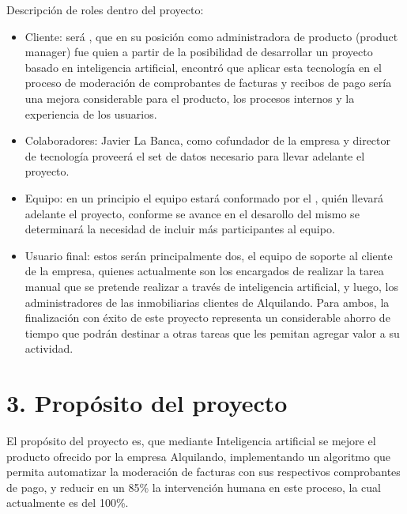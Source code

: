 \documentclass[
11pt, %
]{charter}
\begin{document}
\begin{•}
Descripción de roles dentro del proyecto:

\begin{itemize}

\item Cliente: será \clientename, que en su posición como administradora de producto (product manager) fue quien a partir de la posibilidad de desarrollar un proyecto basado en inteligencia artificial, encontró que aplicar esta tecnología en el proceso de moderación de comprobantes de facturas y recibos de pago sería una mejora considerable para el producto, los procesos internos y la experiencia de los usuarios.
\item Colaboradores: Javier La Banca, como cofundador de la empresa y director de tecnología proveerá el set de datos necesario para llevar adelante el proyecto.
\item Equipo: en un principio el equipo estará conformado por el \authorname, quién llevará adelante el proyecto, conforme se avance en el desarollo del mismo se determinará la necesidad de incluir más participantes al equipo.
\item Usuario final: estos serán principalmente dos, el equipo de soporte al cliente de la empresa, quienes actualmente son los encargados de realizar la tarea manual que se pretende realizar a través de inteligencia artificial, y luego, los administradores de las inmobiliarias clientes de Alquilando. Para ambos, la finalización con éxito de este proyecto representa un considerable ahorro de tiempo que podrán destinar a otras tareas que les pemitan agregar valor a su actividad.
\end{itemize}



\section{3. Propósito del proyecto}
\label{sec:proposito}

\begin{•}%

El propósito del proyecto es, que mediante Inteligencia artificial se mejore el producto ofrecido por la empresa Alquilando, implementando un algoritmo que permita automatizar la moderación de facturas con sus respectivos comprobantes de pago, y reducir en un 85\% la intervención humana en este proceso, la cual actualmente es del 100\%. 



\end{•}
\end{•}
\end{document}
